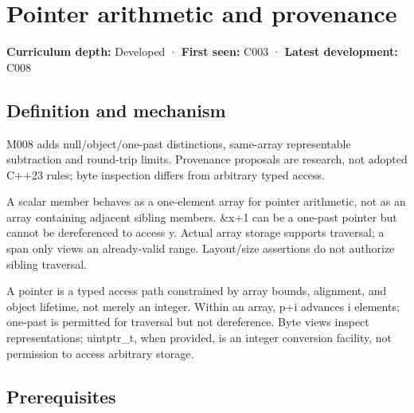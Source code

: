 \hypertarget{appendix-6af5921bc853}{}\label{referencestart:appendix-6af5921bc853}
\section{Pointer arithmetic and provenance}\label{appendix-6af5921bc853-pointer-arithmetic-and-provenance}

\hypertarget{appendix-6af5921bc853-pointer-arithmetic-and-provenance}{}

\textbf{Curriculum depth:} Developed · \textbf{First seen:} C003 · \textbf{Latest development:} C008

\begin{allmightroledefinition}

\subsection{Definition and mechanism}\label{appendix-6af5921bc853-definition-and-mechanism}

\hypertarget{appendix-6af5921bc853-definition-and-mechanism}{}

M008 adds null/object/one-past distinctions, same-array representable subtraction and round-trip limits. Provenance proposals are research, not adopted C++23 rules; byte inspection differs from arbitrary typed access.

\end{allmightroledefinition}

A scalar member behaves as a one-element array for pointer arithmetic, not as an array containing adjacent sibling members. \&x+1 can be a one-past pointer but cannot be dereferenced to access y. Actual array storage supports traversal; a span only views an already-valid range. Layout/size assertions do not authorize sibling traversal.

A pointer is a typed access path constrained by array bounds, alignment, and object lifetime, not merely an integer. Within an array, p+i advances i elements; one-past is permitted for traversal but not dereference. Byte views inspect representations; uintptr\_t, when provided, is an integer conversion facility, not permission to access arbitrary storage.

\subsection{Prerequisites}\label{appendix-6af5921bc853-prerequisites}

\hypertarget{appendix-6af5921bc853-prerequisites}{}

